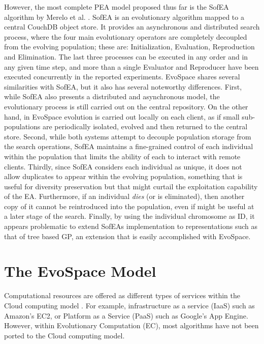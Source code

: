 However, the most complete PEA model proposed thus far is the SofEA algorithm by Merelo et al. \cite{sofea1,sofea2}.
SofEA is an evolutionary algorithm mapped to a central CouchDB object store. It provides an asynchronous and distributed search process,
where the four main evolutionary operators are completely decoupled from the evolving population; these are: Initialization, Evaluation, Reproduction and Elimination.
The last three processes can be executed in any order and in any given time step, and more than a single Evaluator and Reproducer have been executed concurrently
in the reported experiments.
EvoSpace shares several similarities with SofEA, but it also has several noteworthy differences.
First, while SofEA also presents a distributed and asynchronous model, the evolutionary process is still carried out on the central repository.
On the other hand, in EvoSpace evolution is carried out locally on each client, as if small sub-populations are periodically isolated, evolved and then returned to the central store.
Second, while both systems attempt to decouple population storage from the search operations, SofEA maintains a fine-grained control of each individual
within the population that limits the ability of each to interact with remote clients.
Thirdly, since SofEA considers each individual as unique, it does not allow duplicates to appear within the evolving population, something that is useful for diversity preservation but that might curtail the exploitation capability of the EA.
Furthermore, if an individual \emph{dies} (or is eliminated), then another copy of it cannot be reintroduced into the population, even if might be useful
at a later stage of the search.
Finally, by using the individual chromosome as ID, it appears problematic to extend SofEAs implementation to representations such as that of
tree based GP, an extension that is easily accomplished with EvoSpace.

\section{The EvoSpace Model} %
\label{sec:evospace}
Computational resources are offered as different types of services within the Cloud computing model \cite{cloud}.
For example, infrastructure as a service (IaaS) such as Amazon's EC2, or Platform as a Service (PaaS) such as Google's App Engine.
However, within Evolutionary Computation (EC), most algorithms have
not been ported to the Cloud computing model. %

